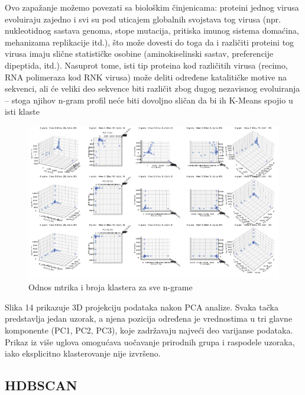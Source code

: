 \documentclass[a4paper,12pt]{article}
\begin{document}
\vspace{1cm}

\noindent
\begin{minipage}{\textwidth}
Ovo zapažanje možemo povezati sa biološkim činjenicama: proteini jednog virusa evoluiraju zajedno i svi su pod uticajem globalnih svojstava tog virusa (npr. nukleotidnog sastava genoma, stope mutacija, pritiska imunog sistema domaćina, mehanizama replikacije itd.), što može dovesti do toga da i različiti proteini tog virusa imaju slične statističke osobine (aminokiselinski sastav, preferencije dipeptida, itd.). Nasuprot tome, isti tip proteina kod različitih virusa (recimo, RNA polimeraza kod RNK virusa) može deliti određene katalitičke motive na sekvenci, ali će veliki deo sekvence biti različit zbog dugog nezavisnog evoluiranja – stoga njihov n-gram profil neće biti dovoljno sličan da bi ih K-Means spojio u isti klaste
\end{minipage}

\begin{figure}[H]
    \centering
    \includegraphics[width=1.2\textwidth]{images/3d.png}
    \caption{Odnos mtrika i broja klastera za sve n-grame}
    \label{fig:3d}
\end{figure}

Slika 14 prikazuje 3D projekciju podataka nakon PCA analize. Svaka tačka predstavlja jedan uzorak, a njena pozicija određena je vrednostima u tri glavne komponente (PC1, PC2, PC3), koje zadržavaju najveći deo varijanse podataka. Prikaz iz više uglova omogućava uočavanje prirodnih grupa i raspodele uzoraka, iako eksplicitno klasterovanje nije izvršeno.

\subsection{HDBSCAN}
\end{document}
